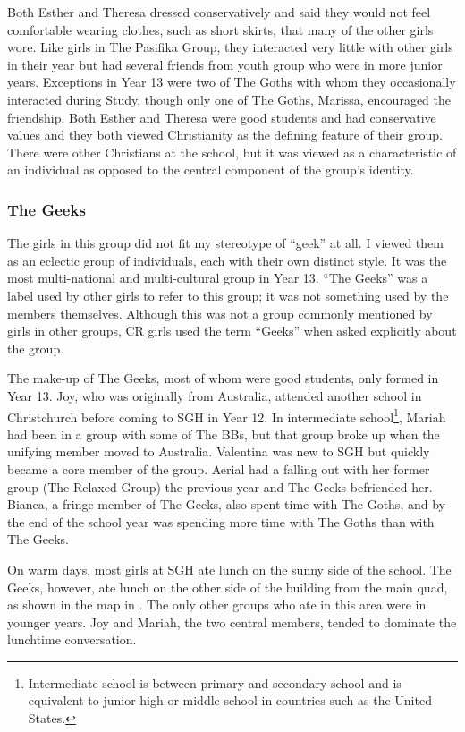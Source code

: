 Both Esther and Theresa dressed conservatively and said they would not feel comfortable wearing clothes, such as short skirts, that many of the other girls wore. Like girls in The Pasifika Group, they interacted very little with other girls in their year but had several friends from youth group who were in more junior years. Exceptions in Year 13 were two of The Goths with whom they occasionally interacted during Study, though only one of The Goths, Marissa, encouraged the friendship. Both Esther and Theresa were good students and had conservative values and they both viewed Christianity as the defining feature of their group. There were other Christians at the school, but it was viewed as a characteristic of an individual as opposed to the central component of the group's identity.
 
\subsubsection{The Geeks}\label{geeks}

The girls in this group did not fit my stereotype of ``geek'' at all. I viewed them as an eclectic group of individuals, each with their own distinct style. It was the most multi-national and multi-cultural group in Year 13. ``The Geeks'' was a label used by other girls to refer to this group; it was not something used by the members themselves. Although this was not a group commonly mentioned by girls in other groups, CR girls used the term ``Geeks'' when asked explicitly about the group. 

The make-up of The Geeks, most of whom were good students, only formed in Year 13. Joy, who was originally from Australia, attended another school in Christchurch before coming to SGH in Year 12. In intermediate school\footnote{Intermediate school is between primary and secondary school and is equivalent to junior high or middle school in countries such as the United States.}, Mariah had been in a group with some of The BBs, but that group broke up when the unifying member moved to Australia. Valentina was new to SGH but quickly became a core member of the group. Aerial had a falling out with her former group (The Relaxed Group) the previous year and The Geeks befriended her. Bianca, a fringe member of The Geeks, also spent time with The Goths, and by the end of the school year was spending more time with The Goths than with The Geeks. 

On warm days, most girls at SGH ate lunch on the sunny side of the school. The Geeks, however, ate lunch on the other side of the building from the main quad, as shown in the map in . The only other groups who ate in this area were in younger years. Joy and Mariah, the two central members, tended to dominate the lunchtime conversation. 

